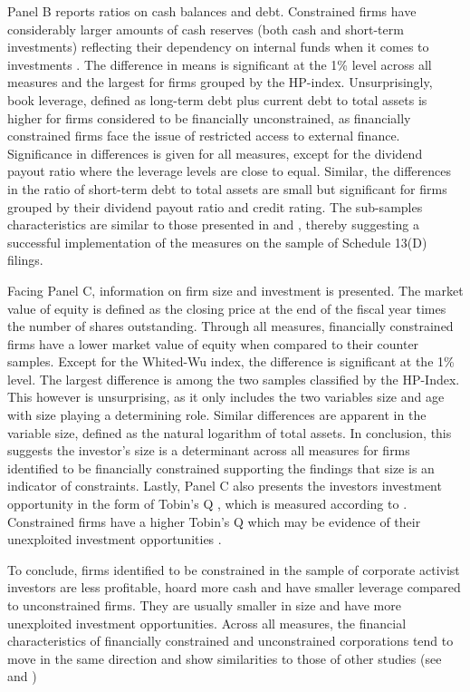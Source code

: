 \documentclass[12pt]{article}
\begin{document}
Panel B reports ratios on cash balances and debt. Constrained firms have considerably larger amounts of cash reserves (both cash and short-term investments) reflecting their dependency on internal funds when it comes to investments \citep[p.142]{Fazzari1988}. The difference in means is significant at the 1\% level across all measures and the largest for firms grouped by the HP-index. Unsurprisingly, book leverage, defined as long-term debt plus current debt to total assets \citep[p.1440]{MacKay2005} is higher for firms considered to be financially unconstrained, as financially constrained firms face the issue of restricted access to external finance. Significance in differences is given for all measures, except for the dividend payout ratio where the leverage levels are close to equal. Similar, the differences in the ratio of short-term debt to total assets are small but significant for firms grouped by their dividend payout ratio and credit rating. The sub-samples characteristics are similar to those presented in \citet[p.544]{Whited2006} and \citet[p.1917]{hadlock2010}, thereby suggesting a successful implementation of the measures on the sample of Schedule 13(D) filings.\par
Facing Panel C, information on firm size and investment is presented. The market value of equity is defined as the closing price at the end of the fiscal year times the number of shares outstanding. Through all measures, financially constrained firms have a lower market value of equity when compared to their counter samples. Except for the Whited-Wu index, the difference is significant at the 1\% level. The largest difference is among the two samples classified by the HP-Index. This however is unsurprising, as it only includes the two variables size and age with size playing a determining role. Similar differences are apparent in the variable size, defined as the natural logarithm of total assets. In conclusion, this suggests the investor's size is a determinant across all measures for firms identified to be financially constrained supporting the findings that size is an indicator of constraints. Lastly, Panel C also presents the investors investment opportunity in the form of Tobin's Q \citep[p.1441]{MacKay2005}, which is measured according to \citet[p.1]{Khatami2014}. Constrained firms have a higher Tobin's Q which may be evidence of their unexploited investment opportunities \citep[p.539]{Whited2006}.\par
To conclude, firms identified to be constrained in the sample of corporate activist investors are less profitable, hoard more cash and have smaller leverage compared to unconstrained firms. They are usually smaller in size and have more unexploited investment opportunities. Across all measures, the financial characteristics of financially constrained and unconstrained corporations tend to move in the same direction and show similarities to those of other studies (see \citet[p.544]{Whited2006} and \citet[p.1917]{hadlock2010})
\end{document}
